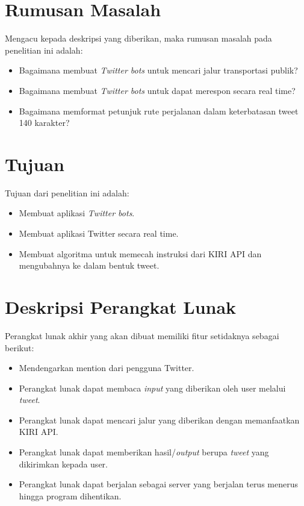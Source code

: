 \documentclass[a4paper,twoside]{article}
\begin{document}
\section{Rumusan Masalah}
Mengacu kepada deskripsi yang diberikan, maka rumusan masalah pada penelitian ini adalah:
\begin{itemize}
	\item Bagaimana membuat \textit{Twitter bots} untuk mencari jalur transportasi publik?
	\item Bagaimana membuat \textit{Twitter bots} untuk dapat merespon secara real time?
	\item Bagaimana memformat petunjuk rute perjalanan dalam keterbatasan tweet 140 karakter?
\end{itemize}

\section{Tujuan}
Tujuan dari penelitian ini adalah:
\begin{itemize}
	\item Membuat aplikasi \textit{Twitter bots}.
	\item Membuat aplikasi Twitter secara real time.
	\item Membuat algoritma untuk memecah instruksi dari KIRI API dan mengubahnya ke dalam bentuk tweet.
\end{itemize}

\section{Deskripsi Perangkat Lunak}
Perangkat lunak akhir yang akan dibuat memiliki fitur setidaknya sebagai berikut:
\begin{itemize}
	\item Mendengarkan mention dari pengguna Twitter.
	\item Perangkat lunak dapat membaca \textit{input} yang diberikan oleh user melalui \textit{tweet}.
	\item Perangkat lunak dapat mencari jalur yang diberikan dengan memanfaatkan KIRI API.
	\item Perangkat lunak dapat memberikan hasil/\textit{output} berupa \textit{tweet} yang dikirimkan kepada user.
	\item Perangkat lunak dapat berjalan sebagai server yang berjalan terus menerus hingga program dihentikan.
\end{itemize}
\end{document}
